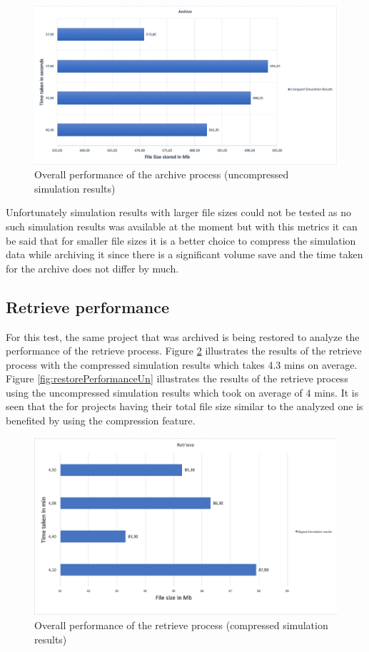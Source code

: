 \begin{figure}[H]
    \centering \includegraphics[scale=0.45]{grafiken/archiveUnzip.png}
    \caption{Overall performance of the archive process (uncompressed simulation results)}
    \label{fig:archivePerformanceUn}
\end{figure}

Unfortunately simulation results with larger file sizes could not be tested as no such simulation results was available at the moment but with this metrics it can be said that
for smaller file sizes it is a better choice to compress the simulation data while archiving it since there is a significant volume save and the time taken for the
archive does not differ by much.   

\subsection{Retrieve performance}
For this test, the same project that was archived is being restored to analyze the performance of the retrieve process. Figure \ref{fig:restorePerformance} illustrates
the results of the retrieve process with the compressed simulation results which takes 4.3 mins on average. Figure \ref{fig:restorePerformanceUn} illustrates the
results of the retrieve process using the uncompressed simulation results which took on average of 4 mins. It is seen that the for projects having their total file
size similar to the analyzed one is benefited by using the compression feature.

\begin{figure}[H]
    \centering \includegraphics[scale=0.5]{grafiken/retrieveZip.png}
    \caption{Overall performance of the retrieve process (compressed simulation results)}
    \label{fig:restorePerformance}
\end{figure}

